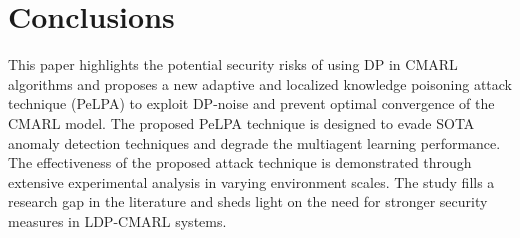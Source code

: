 \section{Conclusions} \label{s:Conclusion}

This paper highlights the potential security risks of using DP in CMARL algorithms and proposes a new adaptive and localized knowledge poisoning attack technique (PeLPA) to exploit DP-noise and prevent optimal convergence of the CMARL model. The proposed PeLPA technique is designed to evade SOTA anomaly detection techniques and degrade the multiagent learning performance. The effectiveness of the proposed attack technique is demonstrated through extensive experimental analysis in varying environment scales. The study fills a research gap in the literature and sheds light on the need for stronger security measures in LDP-CMARL systems.